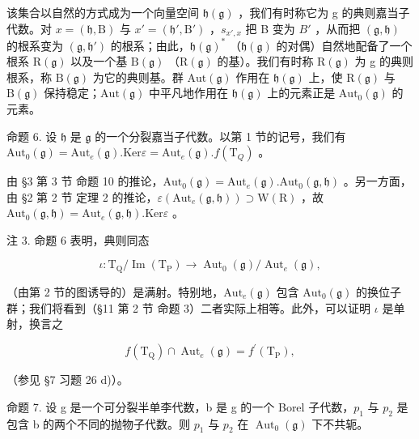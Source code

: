 该集合以自然的方式成为一个向量空间 \(\mathfrak{h}(\mathfrak{g})\) ，我们有时称它为 g 的典则嘉当子代数。对 \(x = (\mathfrak{h}, \mathrm{B})\) 与 \(x' = (\mathfrak{h}', \mathrm{B}')\) ，\(s_{x', x}\) 把 B 变为 \(B'\) ，从而把 \((\mathfrak{g}, \mathfrak{h})\) 的根系变为 \((\mathfrak{g}, \mathfrak{h}')\) 的根系；由此，\(\mathfrak{h}(\mathfrak{g})^*\) （\(\mathfrak{h}(\mathfrak{g})\) 的对偶）自然地配备了一个根系 \(\mathrm{R}(\mathfrak{g})\) 以及一个基 \(\mathrm{B}(\mathfrak{g})\) （\(\mathrm{R}(\mathfrak{g})\) 的基）。我们有时称 \(\mathrm{R}(\mathfrak{g})\) 为 g 的典则根系，称 \(\mathrm{B}(\mathfrak{g})\) 为它的典则基。群 \(\mathrm{Aut}(\mathfrak{g})\) 作用在 \(\mathfrak{h}(\mathfrak{g})\) 上，使 \(\mathrm{R}(\mathfrak{g})\) 与 \(\mathrm{B}(\mathfrak{g})\) 保持稳定；\(\mathrm{Aut}(\mathfrak{g})\) 中平凡地作用在 \(\mathfrak{h}(\mathfrak{g})\) 上的元素正是 \(\mathrm{Aut}_0(\mathfrak{g})\) 的元素。

命题 6. 设 \(\mathfrak{h}\) 是 \(\mathfrak{g}\) 的一个分裂嘉当子代数。以第 1 节的记号，我们有 \(\mathrm{Aut}_0(\mathfrak{g}) = \mathrm{Aut}_e(\mathfrak{g}).\mathrm{Ker}\varepsilon = \mathrm{Aut}_e(\mathfrak{g}).f(\mathrm{T}_Q)\) 。

由 §3 第 3 节 命题 10 的推论，\(\mathrm{Aut}_0(\mathfrak{g}) = \mathrm{Aut}_e(\mathfrak{g}).\mathrm{Aut}_0(\mathfrak{g},\mathfrak{h})\) 。另一方面，由 §2 第 2 节 定理 2 的推论，\(\varepsilon (\mathrm{Aut}_e(\mathfrak{g},\mathfrak{h}))\supset \mathrm{W}(\mathrm{R})\) ，故 \(\mathrm{Aut}_0(\mathfrak{g},\mathfrak{h}) = \mathrm{Aut}_e(\mathfrak{g},\mathfrak{h}).\mathrm{Ker}\varepsilon\) 。

注 3. 命题 6 表明，典则同态

\[
\iota : \mathrm{T} _ {\mathrm{Q}} / \operatorname{Im} (\mathrm{T} _ {\mathrm{P}}) \to \operatorname{Aut} _ {0} (\mathfrak {g}) / \operatorname{Aut} _ {e} (\mathfrak {g}),
\]

（由第 2 节的图诱导的）是满射。特别地，\(\mathrm{Aut}_e(\mathfrak{g})\) 包含 \(\mathrm{Aut}_0(\mathfrak{g})\) 的换位子群；我们将看到（§11 第 2 节 命题 3）二者实际上相等。此外，可以证明 \(\iota\) 是单射，换言之

\[
f (\mathrm{T} _ {\mathrm{Q}}) \cap \operatorname{Aut} _ {e} (\mathfrak {g}) = f ^ {\prime} (\mathrm{T} _ {\mathrm{P}}),
\]

（参见 §7 习题 26 d)）。

命题 7. 设 g 是一个可分裂半单李代数，b 是 g 的一个 Borel 子代数，\(p_{1}\) 与 \(p_{2}\) 是包含 b 的两个不同的抛物子代数。则 \(p_{1}\) 与 \(p_{2}\) 在 \(\operatorname{Aut}_{0}(\mathfrak{g})\) 下不共轭。

